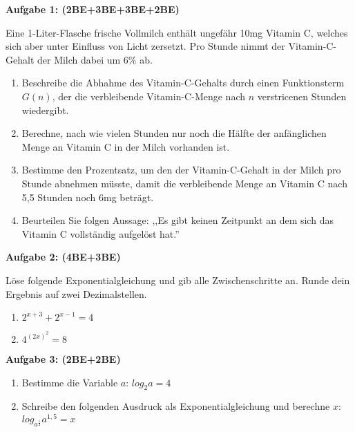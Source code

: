 \documentclass[a4paper,12pt]{article}
\newcommand{\Aufgabe}[1]{
  {
  \vspace*{0.5cm}
  \textsf{\textbf{Aufgabe #1}}
  \vspace*{0.2cm}
  
  }
}
\begin{document}

\Aufgabe{1: (2BE+3BE+3BE+2BE)}
Eine 1-Liter-Flasche frische Vollmilch enthält ungefähr 10mg Vitamin C, welches sich aber unter Einfluss von Licht zersetzt. Pro Stunde nimmt der Vitamin-C-Gehalt der Milch dabei um 6\% ab.\\

\begin{enumerate}[label={\alph*)}, topsep=5pt,itemsep=4ex,partopsep=1ex,parsep=1ex]
  \item Beschreibe die Abhahme des Vitamin-C-Gehalts durch einen Funktionsterm $G(n)$, der die verbleibende Vitamin-C-Menge nach $n$ verstricenen Stunden wiedergibt.  
  \item Berechne, nach wie vielen Stunden nur noch die Hälfte der anfänglichen Menge an Vitamin C in der Milch vorhanden ist.
  \item Bestimme den Prozentsatz, um den der Vitamin-C-Gehalt in der Milch pro Stunde abnehmen müsste, damit die verbleibende Menge an Vitamin C nach 5,5 Stunden noch 6mg beträgt.
  \item Beurteilen Sie folgen Aussage: ,,Es gibt keinen Zeitpunkt an dem sich das Vitamin C vollständig aufgelöst hat.''
\end{enumerate}

\Aufgabe{2: (4BE+3BE)}
Löse folgende Exponentialgleichung und gib alle Zwischenschritte an. Runde dein Ergebnis auf zwei Dezimalstellen.

\begin{enumerate}[label={\alph*)}, topsep=5pt,itemsep=4ex,partopsep=1ex,parsep=1ex]
  \item $2^{x+3} + 2^{x-1} = 4$

  \item $4^{(2x)^2} = 8$

\end{enumerate}

\newpage
\Aufgabe{3: (2BE+2BE)}

\begin{enumerate}[label={\alph*)}, topsep=5pt,itemsep=4ex,partopsep=1ex,parsep=1ex]
  \item Bestimme die Variable $a$: $ log_2 a = 4 $
  \item Schreibe den folgenden Ausdruck als Exponentialgleichung und berechne $x$: $ log_{a^{\frac{1}{2}}} a^{1,5} = x $

\end{enumerate}
\end{document}
